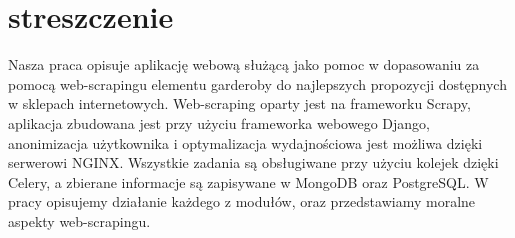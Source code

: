 \section{streszczenie}

Nasza praca opisuje aplikację webową służącą jako pomoc w dopasowaniu za pomocą web-scrapingu elementu garderoby do najlepszych propozycji dostępnych w sklepach internetowych. Web-scraping oparty jest na frameworku Scrapy, aplikacja zbudowana jest przy użyciu frameworka webowego Django, anonimizacja użytkownika i optymalizacja wydajnościowa jest możliwa dzięki serwerowi NGINX. Wszystkie zadania są obsługiwane przy użyciu kolejek dzięki Celery, a zbierane informacje są zapisywane w MongoDB oraz PostgreSQL. W pracy opisujemy działanie każdego z modułów, oraz przedstawiamy moralne aspekty web-scrapingu.